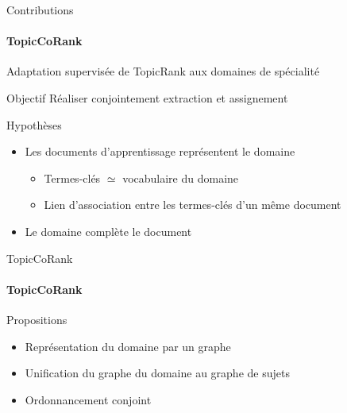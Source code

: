 \begin{frame}{Contributions}\framesubtitle{TopicCoRank}
  Adaptation supervisée de TopicRank aux domaines de spécialité

  \vspace{1em}

  \begin{block}{Objectif}
    Réaliser conjointement extraction et assignement
  \end{block}

  \vspace{1em}

  \begin{block}{Hypothèses}
    \begin{itemize}
      \item{Les documents d'apprentissage représentent le domaine}
      \begin{itemize}
        \item{Termes-clés $\simeq$ vocabulaire du domaine}
        \item{Lien d'association entre les termes-clés d'un même document}
      \end{itemize}
      \item{Le domaine complète le document}
    \end{itemize}
  \end{block}
\end{frame}

\begin{frame}{TopicCoRank}\framesubtitle{TopicCoRank}
  \begin{block}{Propositions}
    \begin{itemize}
      \item{Représentation du domaine par un graphe}
      \item{Unification du graphe du domaine au graphe de sujets}
      \item{Ordonnancement conjoint}
    \end{itemize}
  \end{block}
\end{frame}

